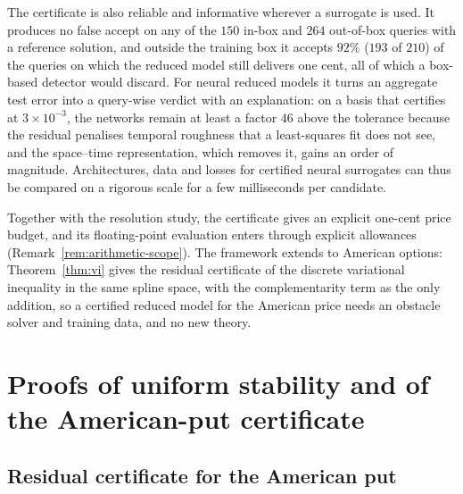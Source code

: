 \documentclass[hidelinks]{siamart251216}
\begin{document}
The certificate is also reliable and informative wherever a surrogate is used.  It produces no false
accept on any of the $150$ in-box and $264$ out-of-box queries with a reference solution, and outside
the training box it accepts $92\%$ ($193$ of $210$) of the queries on which the reduced model still
delivers one cent, all of which a box-based detector would discard.  For neural reduced models it
turns an aggregate test error into a query-wise verdict with an explanation: on a basis that
certifies at $3\times10^{-3}$, the networks remain at least a factor $46$ above the tolerance because
the residual penalises temporal roughness that a least-squares fit does not see, and the space--time
representation, which removes it, gains an order of magnitude.  Architectures, data and losses for
certified neural surrogates can thus be compared on a rigorous scale for a few milliseconds per
candidate.

Together with the resolution study, the certificate gives an explicit one-cent price budget, and its
floating-point evaluation enters through explicit allowances (Remark~\ref{rem:arithmetic-scope}).
The framework extends to American options: Theorem~\ref{thm:vi} gives the residual certificate of
the discrete variational inequality in the same spline space, with the complementarity term as the
only addition, so a certified reduced model for the American price needs an obstacle solver and
training data, and no new theory.
\FloatBarrier

\appendix
\section{Proofs of uniform stability and of the American-put certificate}
\label{app:proofs}

\subsection{Residual certificate for the American put}
\label{ssec:vi}



\end{document}
